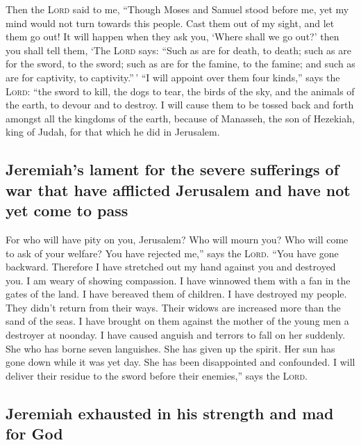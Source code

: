  Then the \textsc{Lord} said to me, ``Though Moses and
Samuel stood before me, yet my mind would not turn towards this people.
Cast them out of my sight, and let them go out!  It will
happen when they ask you, `Where shall we go out?' then you shall tell
them, `The \textsc{Lord} says: ``Such as are for death, to death; such
as are for the sword, to the sword; such as are for the famine, to the
famine; and such as are for captivity, to captivity.''\,' 
``I will appoint over them four kinds,'' says the \textsc{Lord}: ``the
sword to kill, the dogs to tear, the birds of the sky, and the animals
of the earth, to devour and to destroy.  I will cause them
to be tossed back and forth amongst all the kingdoms of the earth,
because of Manasseh, the son of Hezekiah, king of Judah, for that which
he did in Jerusalem.

\hypertarget{jeremiahs-lament-for-the-severe-sufferings-of-war-that-have-afflicted-jerusalem-and-have-not-yet-come-to-pass}{%
\subsection{Jeremiah's lament for the severe sufferings of war that have
afflicted Jerusalem and have not yet come to
pass}\label{jeremiahs-lament-for-the-severe-sufferings-of-war-that-have-afflicted-jerusalem-and-have-not-yet-come-to-pass}}

 For who will have pity on you, Jerusalem? Who will mourn
you? Who will come to ask of your welfare?  You have
rejected me,'' says the \textsc{Lord}. ``You have gone backward.
Therefore I have stretched out my hand against you and destroyed you. I
am weary of showing compassion.  I have winnowed them with
a fan in the gates of the land. I have bereaved them of children. I have
destroyed my people. They didn't return from their ways. 
Their widows are increased more than the sand of the seas. I have
brought on them against the mother of the young men a destroyer at
noonday. I have caused anguish and terrors to fall on her suddenly.
 She who has borne seven languishes. She has given up the
spirit. Her sun has gone down while it was yet day. She has been
disappointed and confounded. I will deliver their residue to the sword
before their enemies,'' says the \textsc{Lord}.

\hypertarget{jeremiah-exhausted-in-his-strength-and-mad-for-god}{%
\subsection{Jeremiah exhausted in his strength and mad for
God}\label{jeremiah-exhausted-in-his-strength-and-mad-for-god}}

